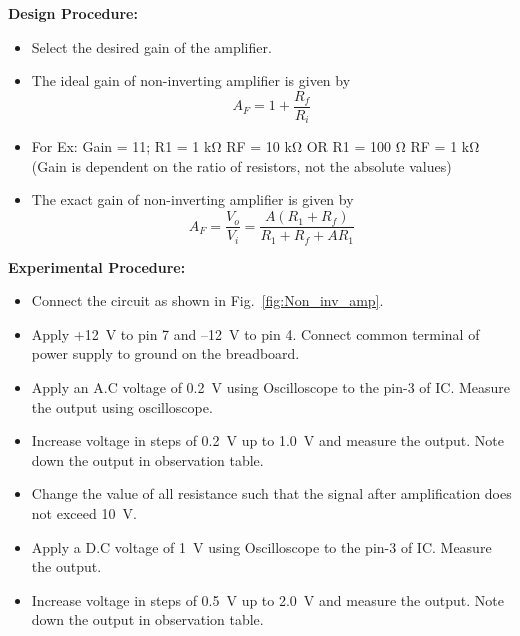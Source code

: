 \documentclass[9pt]{scrreprt}
\begin{document}
\textbf{Design Procedure:}
\begin{itemize}
\item Select the desired gain of the amplifier.
\item The ideal gain of non-inverting amplifier is given by
\begin{equation*}
A_F = 1+\frac{R_f}{R_i}
\end{equation*}
\item For Ex: Gain = 11; R1 = 1 k$\si{\ohm}$ RF = 10 k$\si{\ohm}$ OR R1 = 100 $\si{\ohm}$ RF = 1 k$\si{\ohm}$ (Gain is dependent on the ratio of resistors, not the absolute values)
\item The exact gain of non-inverting amplifier is given by
\begin{equation*}
A_F = \frac{V_o}{V_i} = \frac{A(R_1 + R_f)}{R_1 + R_f + AR_1}
\end{equation*}
\end{itemize}

\textbf{Experimental Procedure:}
\begin{itemize}
\item Connect the circuit as shown in Fig.~\ref{fig:Non_inv_amp}.
\item Apply +12~V to pin 7 and –12~V to pin 4. Connect common terminal of power supply to ground on the breadboard.
\item Apply an A.C voltage of 0.2~V using Oscilloscope to the pin-3 of IC. Measure the output using oscilloscope.
\item Increase voltage in steps of 0.2~V up to 1.0~V and measure the output. Note down the output in observation table.
\item Change the value of all resistance such that the signal after amplification does not exceed 10~V.
\item Apply a D.C voltage of 1~V using Oscilloscope to the pin-3 of IC. Measure the output.
\item Increase voltage in steps of 0.5~V up to 2.0~V and measure the output. Note down the output in observation table.
\end{itemize}
\end{document}
